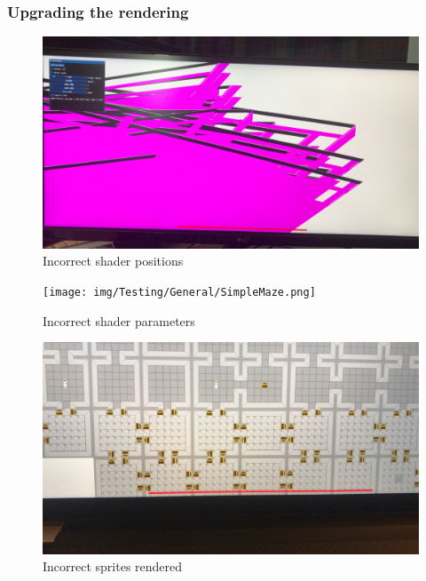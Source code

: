 \documentclass[../Main.tex]{subfiles}
\begin{document}
        \clearpage
        \subsubsection{Upgrading the rendering}
            \begin{figure}[hbt!]
                \centerline{\includegraphics[scale=0.09]{img/Testing/General/ShaderIssue.jpg}}
                \caption{Incorrect shader positions}
                \label{fig:IncorrectShaderPos}
            \end{figure}
            \begin{figure}[hbt!]
                \centerline{\texttt{[image: img/Testing/General/SimpleMaze.png]}}
                \caption{Incorrect shader parameters}
                \label{fig:IncorrectShader}
            \end{figure}
            \begin{figure}[hbt!]
                \centerline{\includegraphics[scale=0.09]{img/Testing/General/Not refreshing buffer2.jpg}}
                \caption{Incorrect sprites rendered}
                \label{fig:IncorrectSprite1}
            \end{figure}
\end{document}
